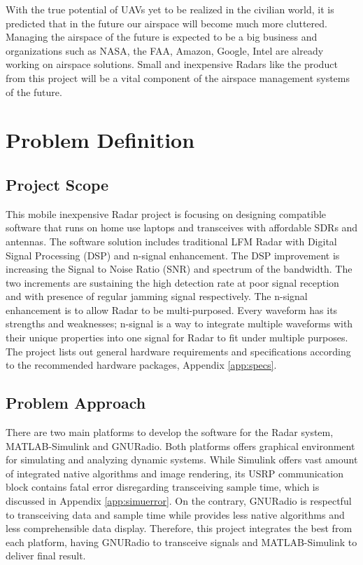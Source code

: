 \documentclass[letterpaper, 12 pt, conference]{report}
\numberwithin{figure}{section}
\begin{document}
With the true potential of UAVs yet to be realized in the civilian world, it is predicted that in the future our airspace will become much more cluttered. Managing the airspace of the future is expected to be a big business and organizations such as NASA, the FAA, Amazon, Google, Intel are already working on airspace solutions\cite{gipson_nasa_2017}. Small and inexpensive Radars like the product from this project will be a vital component of the airspace management systems of the future.




\newpage
\section{Problem Definition}
\subsection{Project Scope}
This mobile inexpensive Radar project is focusing on designing compatible software that runs on home use laptops and transceives with affordable SDRs and antennas. The software solution includes traditional LFM Radar with Digital Signal Processing (DSP) and n-signal enhancement. The DSP improvement is increasing the Signal to Noise Ratio (SNR) and spectrum of the bandwidth. The two increments are sustaining the high detection rate at poor signal reception and with presence of regular jamming signal respectively. The n-signal enhancement is to allow Radar to be multi-purposed. Every waveform has its strengths and weaknesses; n-signal is a way to integrate multiple waveforms with their unique properties into one signal for Radar to fit under multiple purposes. The project lists out general hardware requirements and specifications according to the recommended hardware packages, Appendix \ref{app:specs}. 
\subsection{Problem Approach}
There are two main platforms to develop the software for the Radar system, MATLAB-Simulink and GNURadio. Both platforms offers graphical environment for simulating and analyzing dynamic systems. While Simulink offers vast amount of integrated native algorithms and image rendering, its USRP communication block contains fatal error disregarding transceiving sample time, which is discussed in Appendix \ref{app:simuerror}. On the contrary, GNURadio is respectful to transceiving data and sample time while provides less native algorithms and less comprehensible data display. Therefore, this project integrates the best from each platform, having GNURadio to transceive signals and MATLAB-Simulink to deliver final result. 
\end{document}
